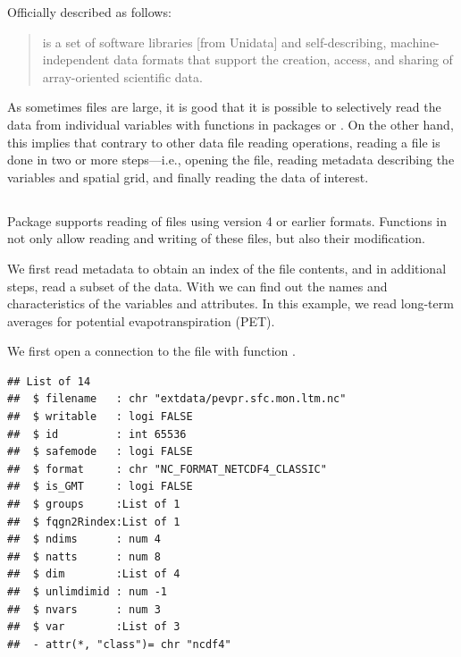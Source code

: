 \documentclass[krantz2]{krantz}\usepackage{knitr}
\begin{document}
Officially described as follows:
\begin{quote}
 is a set of software libraries [from Unidata] and self-describing, machine-independent data formats that support the creation, access, and sharing of array-oriented scientific data.
\end{quote}

As sometimes  files are large, it is good that it is possible to selectively read the data from individual variables with functions in packages  or . On the other hand, this implies that contrary to other data file reading operations, reading a  file is done in two or more steps---i.e., opening the file, reading metadata describing the variables and spatial grid, and finally reading the data of interest.

\subsection[ncdf4]{}



Package  supports reading of files using  version 4 or earlier formats. Functions in  not only allow reading and writing of these files, but also their modification.

We first read metadata to obtain an index of the file contents, and in additional steps, read a subset of the data. With  we can find out the names and characteristics of the variables and attributes. In this example, we read long-term averages for potential evapotranspiration (PET).

We first open a connection to the file with function .

\begin{knitrout}\footnotesize
{}\color{fgcolor}\begin{kframe}
\begin{alltt}
 \hlkwb{<-} \hlstd{(}\hlstd{)}
  \hlstd{=} \hlstd{)}
\end{alltt}
\begin{verbatim}
## List of 14
##  $ filename   : chr "extdata/pevpr.sfc.mon.ltm.nc"
##  $ writable   : logi FALSE
##  $ id         : int 65536
##  $ safemode   : logi FALSE
##  $ format     : chr "NC_FORMAT_NETCDF4_CLASSIC"
##  $ is_GMT     : logi FALSE
##  $ groups     :List of 1
##  $ fqgn2Rindex:List of 1
##  $ ndims      : num 4
##  $ natts      : num 8
##  $ dim        :List of 4
##  $ unlimdimid : num -1
##  $ nvars      : num 3
##  $ var        :List of 3
##  - attr(*, "class")= chr "ncdf4"
\end{verbatim}
\end{kframe}
\end{knitrout}
\end{document}
